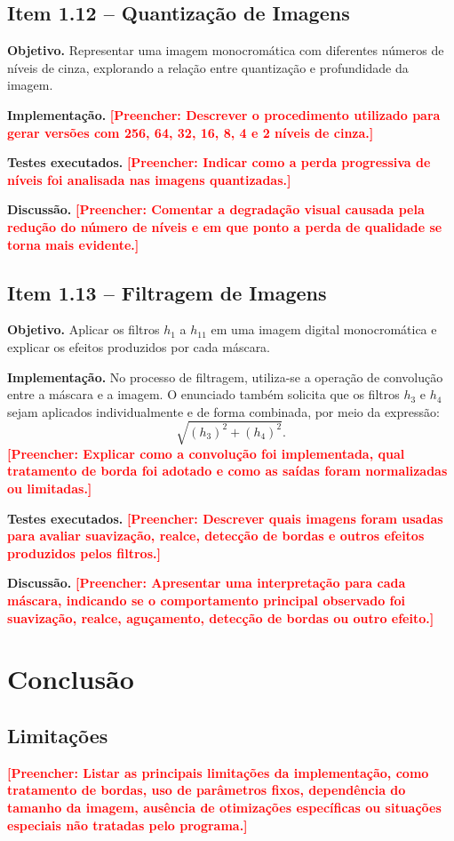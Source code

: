 \documentclass[12pt,a4paper]{article}
\newcommand{\placeholder}[1]{\textcolor{red}{\textbf{[Preencher: #1]}}}
\newcommand{\campo}[2]{\textbf{#1.} #2\par}
\begin{document}
\subsection{Item 1.12 -- Quantização de Imagens}

\campo{Objetivo}{Representar uma imagem monocromática com diferentes números de níveis de cinza, explorando a relação entre quantização e profundidade da imagem.}
\campo{Implementação}{\placeholder{Descrever o procedimento utilizado para gerar versões com 256, 64, 32, 16, 8, 4 e 2 níveis de cinza.}}
\campo{Testes executados}{\placeholder{Indicar como a perda progressiva de níveis foi analisada nas imagens quantizadas.}}
\campo{Discussão}{\placeholder{Comentar a degradação visual causada pela redução do número de níveis e em que ponto a perda de qualidade se torna mais evidente.}}

\subsection{Item 1.13 -- Filtragem de Imagens}

\campo{Objetivo}{Aplicar os filtros $h_1$ a $h_{11}$ em uma imagem digital monocromática e explicar os efeitos produzidos por cada máscara.}
\campo{Implementação}{No processo de filtragem, utiliza-se a operação de convolução entre a máscara e a imagem. O enunciado também solicita que os filtros $h_3$ e $h_4$ sejam aplicados individualmente e de forma combinada, por meio da expressão:
\[
  \sqrt{(h_3)^2 + (h_4)^2}.
\]
\placeholder{Explicar como a convolução foi implementada, qual tratamento de borda foi adotado e como as saídas foram normalizadas ou limitadas.}}
\campo{Testes executados}{\placeholder{Descrever quais imagens foram usadas para avaliar suavização, realce, detecção de bordas e outros efeitos produzidos pelos filtros.}}
\campo{Discussão}{\placeholder{Apresentar uma interpretação para cada máscara, indicando se o comportamento principal observado foi suavização, realce, aguçamento, detecção de bordas ou outro efeito.}}

\section{Conclusão}

\subsection{Limitações}

\placeholder{Listar as principais limitações da implementação, como tratamento de bordas, uso de parâmetros fixos, dependência do tamanho da imagem, ausência de otimizações específicas ou situações especiais não tratadas pelo programa.}
\end{document}
